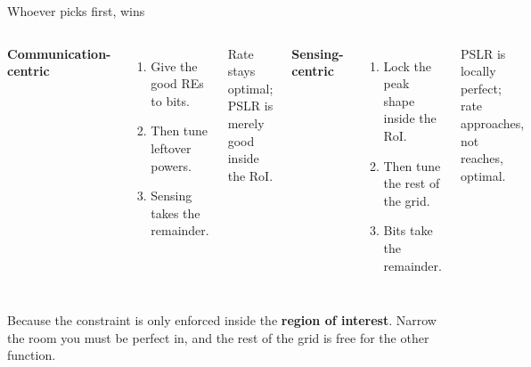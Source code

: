 \begin{frame}{Whoever picks first, wins}
  \vspace{0.4em}
  \begin{columns}[T,onlytextwidth]
      {\small\textbf{\textcolor{ranblue}{Communication-centric}}\par}
      \vspace{0.4em}
      \small
      \begin{enumerate}\itemsep4pt
        \item Give the good REs to bits.
        \item Then tune leftover powers.
        \item Sensing takes the remainder.
      \end{enumerate}

      \vspace{0.4em}
      {\scriptsize\textcolor{softgray}{Rate stays optimal; PSLR is merely good inside the RoI.}\par}
      {\small\textbf{\textcolor{coreorange}{Sensing-centric}}\par}
      \vspace{0.4em}
      \small
      \begin{enumerate}\itemsep4pt
        \item Lock the peak shape inside the RoI.
        \item Then tune the rest of the grid.
        \item Bits take the remainder.
      \end{enumerate}

      \vspace{0.4em}
      {\scriptsize\textcolor{softgray}{PSLR is locally perfect; rate approaches, not reaches, optimal.}\par}
  \end{columns}

  \vspace{0.7em}
     {Because the constraint is only enforced inside the \textbf{region of
      interest}. Narrow the room you must be perfect in, and the rest of the grid
      is free for the other function.}
\end{frame}
